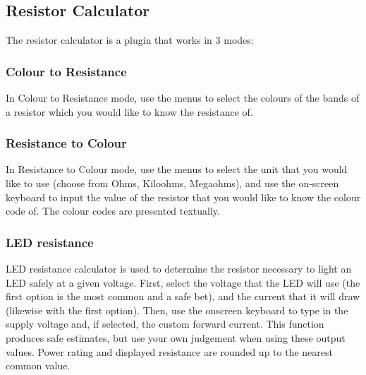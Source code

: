 \subsection{Resistor Calculator}

The resistor calculator is a plugin that works in 3 modes:

\subsubsection{Colour to Resistance}

In Colour to Resistance mode, use the menus to select the colours of the
bands of a resistor which you would like to know the resistance of.
   
\subsubsection{Resistance to Colour}

In Resistance to Colour mode, use the menus to select the unit that you
would like to use (choose from Ohms, Kiloohms, Megaohms), and use
the on-screen keyboard to input the value of the resistor that you would
like to know the colour code of. The colour codes are presented
 textually.

\subsubsection{LED resistance}

LED resistance calculator is used to determine the resistor necessary to light
an LED safely at a given voltage. First, select the voltage that the LED will
use (the first option is the most common and a safe bet), and the current
that it will draw (likewise with the first option). Then, use the onscreen
keyboard to type in the supply voltage and, if selected, the custom 
forward current. This function produces safe estimates, but use your own
judgement when using these output values. Power rating and displayed resistance
are rounded up to the nearest common value.
